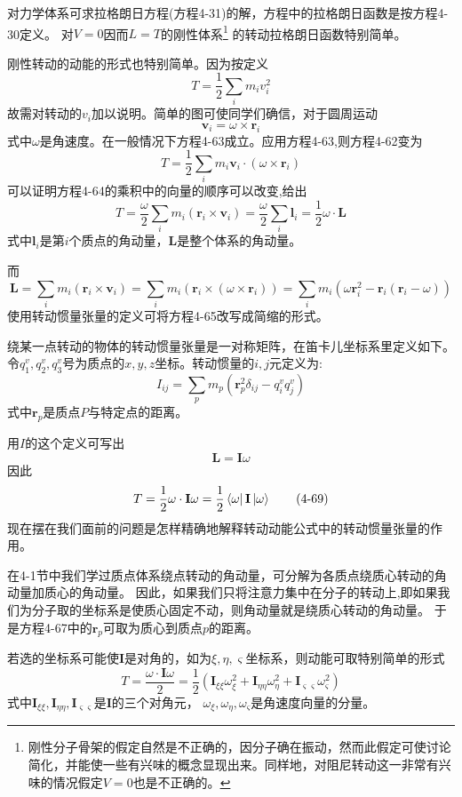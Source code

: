 对力学体系可求拉格朗日方程(方程4-31)的解，方程中的拉格朗日函数是按方程4-30定义。
对$V=0$因而$L=T$的刚性体系\footnote{刚性分子骨架的假定自然是不正确的，因分子确在振动，然而此假定可使讨论简化，并能使一些有兴味的概念显现出来。同样地，对阻尼转动这一非常有兴味的情况假定$V=0$也是不正确的。}
的转动拉格朗日函数特别简单。

刚性转动的动能的形式也特别简单。因为按定义
\[T=\frac{1}{2}\sum_im_iv_i^2 \tag{4-62}\]
故需对转动的$v_i$加以说明。简单的图可使同学们确信，对于圆周运动
\[\mathbf{v}_i=\omega \times \mathbf{r}_i \tag{4-63}\]
式中$\omega$是角速度。在一般情况下方程4-63成立。应用方程4-63,则方程4-62变为
\[T=\frac{1}{2}\sum_im_i\mathbf{v}_i \cdot (\omega \times \mathbf{r}_i) \tag{4-64}\]
可以证明方程4-64的乘积中的向量的顺序可以改变,给出
\[T=\frac{\omega}{2}\sum_im_i(\mathbf{r}_i \times \mathbf{v}_i)=\frac{\omega}{2}\sum_i\mathbf{l}_i=\frac{1}{2}\omega \cdot \mathbf{L} \tag{4-65}\]
式中$\mathbf{l}_i$是第$i$个质点的角动量，$\mathbf{L}$是整个体系的角动量。

而
\[\mathbf{L}=\sum_im_i(\mathbf{r}_i \times \mathbf{v}_i)=\sum_im_i(\mathbf{r}_i \times (\omega \times \mathbf{r}_i))=\sum_im_i(\omega\mathbf{r}_i^2-\mathbf{r}_i(\mathbf{r}_i-\omega)) \tag{4-66}\]
使用转动惯量张量的定义可将方程4-65改写成简缩的形式。
\begin{definition}[转动惯量张量]
    绕某一点转动的物体的转动惯量张量是一对称矩阵，在笛卡儿坐标系里定义如下。
    令$q_1^v,q_2^v,q_3^v$号为质点的$x,y,z$坐标。转动惯量的$i,j$元定义为:
    \[I_{ij}=\sum_pm_p(\mathbf{r}_p^2\delta_{ij}-q_i^vq_j^v) \tag{4-67}\]
    式中$\mathbf{r}_p$是质点$P$与特定点的距离。
\end{definition}

用$I$的这个定义可写出
\[\mathbf{L}=\mathbf{I}\omega \tag{4-68}\]
因此
\[T=\frac{1}{2}\omega \cdot \mathbf{I}\omega=\frac{1}{2}\bra*{\omega}\mathbf{I}\ket*{\omega} \tag{4-69}\]
现在摆在我们面前的问题是怎样精确地解释转动动能公式中的转动惯量张量的作用。

在4-1节中我们学过质点体系绕点转动的角动量，可分解为各质点绕质心转动的角动量加质心的角动量。
因此，如果我们只将注意力集中在分子的转动上,即如果我们为分子取的坐标系是使质心固定不动，则角动量就是绕质心转动的角动量。
于是方程4-67中的$\mathbf{r}_p$可取为质心到质点$p$的距离。

若选的坐标系可能使$\mathbf{I}$是对角的，如为$\xi,\eta,\varsigma$坐标系，则动能可取特别简单的形式
\[T=\frac{\omega \cdot \mathbf{I}\omega}{2}=\frac{1}{2}\left(\mathbf{I}_{\xi\xi}\omega_{\xi}^2+\mathbf{I}_{\eta\eta}\omega_{\eta}^2+\mathbf{I}_{\varsigma\varsigma}\omega_{\varsigma}^2\right) \tag{4-70}\]
式中$\mathbf{I}_{\xi\xi},\mathbf{I}_{\eta\eta},\mathbf{I}_{\varsigma\varsigma}$是$\mathbf{I}$的三个对角元，
$\omega_{\xi},\omega_{\eta},\omega_{\varsigma}$是角速度向量的分量。

